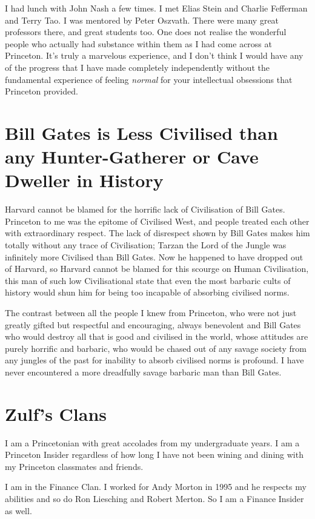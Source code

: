 \documentclass{amsart}
\begin{document}
I had lunch with John Nash a few times.  I met Elias Stein and Charlie Fefferman and Terry Tao.  I was mentored by Peter Oszvath.  There were many great professors there, and great students too.  One does not realise the wonderful people who actually had substance within them as I had come across at Princeton.  It's truly a marvelous experience, and I don't think I would have any of the progress that I have made completely independently without the fundamental experience of feeling {\em normal} for your intellectual obsessions that Princeton provided.

\section{Bill Gates is Less Civilised than any Hunter-Gatherer or Cave Dweller in History}

Harvard cannot be blamed for the horrific lack of Civilisation of Bill Gates.  Princeton to me was the epitome of Civilised West, and people treated each other with extraordinary respect.  The lack of disrespect shown by Bill Gates makes him totally without any trace of Civilisation; Tarzan the Lord of the Jungle was infinitely more Civilised than Bill Gates.  Now he happened to have dropped out of Harvard, so Harvard cannot be blamed for this scourge on Human Civilisation, this man of such low Civilisational state that even the most barbaric cults of history would shun him for being too incapable of absorbing civilised norms.

The contrast between all the people I knew from Princeton, who were not just greatly gifted but respectful and encouraging, always benevolent and Bill Gates who would destroy all that is good and civilised in the world, whose attitudes are purely horrific and barbaric, who would be chased out of any savage society from any jungles of the past for inability to absorb civilised norms is profound.  I have never encountered a more dreadfully savage barbaric man than Bill Gates.

\section{Zulf's Clans}

I am a Princetonian with great accolades from my undergraduate years.  I am a Princeton Insider regardless of how long I have not been wining and dining with my Princeton classmates and friends.

I am in the Finance Clan. I worked for Andy Morton in 1995 and he respects my abilities and so do Ron Liesching and Robert Merton.  So I am a Finance Insider as well.
\end{document}
